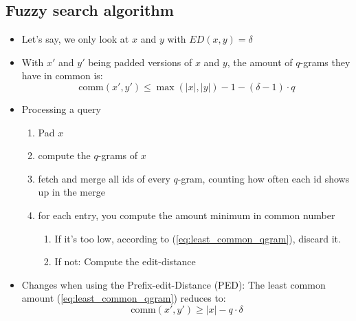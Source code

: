 \documentclass[a4paper]{scrartcl}
\begin{document}
\subsection{Fuzzy search algorithm}
\label{sec:fuzzy_search_algorithm}
\begin{itemize}
\item Let's say, we only look at $x$ and $y$ with $ED(x,y)=\delta$
\item With $x'$ and $y'$ being padded versions of $x$ and $y$, the amount of
  $q$-grams they have in common is:
  \begin{equation}
  \mathrm{comm}(x',y')\le \max(|x|,|y|)-1-(\delta - 1)\cdot q\label{eq:least_common_qgram}
\end{equation}

\item Processing a query
  \begin{enumerate}
  \item Pad $x$
  \item compute the $q$-grams of $x$
  \item fetch and merge all ids of every $q$-gram, counting how often each id
    shows up in the merge
  \item for each entry, you compute the amount minimum in common number
    \begin{enumerate}
    \item If it's too low, according to (\ref{eq:least_common_qgram}), discard
      it.
    \item If not: Compute the edit-distance
    \end{enumerate}
    
  \end{enumerate}
\item Changes when using the Prefix-edit-Distance (PED): The least common amount
  (\ref{eq:least_common_qgram}) reduces to:
  \begin{equation}
    \label{eq:least_common_ped}
    \mathrm{comm}(x',y')\ge |x|-q\cdot \delta
  \end{equation}
\end{itemize}

\end{document}
